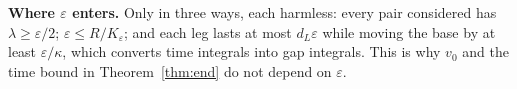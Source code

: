 \textbf{Where $\varepsilon$ enters.} Only in three ways, each harmless: every pair considered has $\lambda\ge\varepsilon/2$;
$\varepsilon\le R/K_\varepsilon$; and each leg lasts at most $d_L\varepsilon$ while moving the base by at least
$\varepsilon/\kappa$, which converts time integrals into gap integrals. This is why $v_0$ and the time bound in
Theorem~\ref{thm:end} do not depend on $\varepsilon$.
